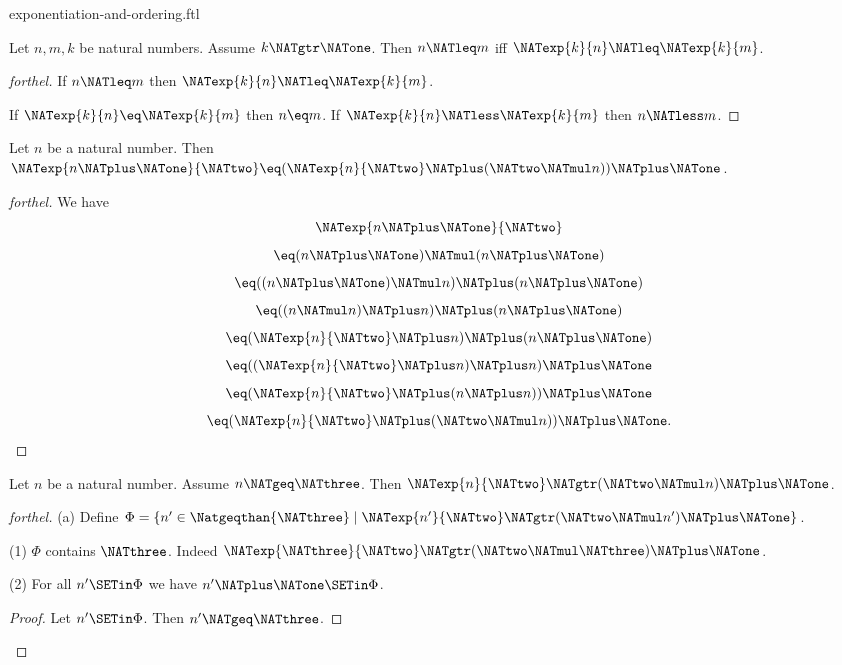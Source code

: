 \documentclass{naproche-library}
\begin{document}
\begin{smodule}[title=Exponentiation and Ordering]{exponentiation-and-ordering.ftl}
\begin{corollary}[forthel,id=ARITHMETIC_09_2876620253691904]
  Let $n, m, k$ be natural numbers.
  Assume $k \NATgtr \NATone$.
  Then $n \NATleq m$ iff $\NATexp{k}{n} \NATleq \NATexp{k}{m}$.
\end{corollary}
\begin{proof}[forthel]
  If $n \NATleq m$ then $\NATexp{k}{n} \NATleq \NATexp{k}{m}$.

  If $\NATexp{k}{n} \eq \NATexp{k}{m}$ then $n \eq m$.
  If $\NATexp{k}{n} \NATless \NATexp{k}{m}$ then $n \NATless m$.
\end{proof}

\begin{proposition}[forthel,id=ARITHMETIC_09_6984104377581568]
  Let $n$ be a natural number.
  Then $\NATexp{n \NATplus \NATone}{\NATtwo} \eq (\NATexp{n}{\NATtwo} \NATplus (\NATtwo \NATmul n)) \NATplus \NATone$.
\end{proposition}
\begin{proof}[forthel]
  We have
  \[  \NATexp{n \NATplus \NATone}{\NATtwo}                       \]
  \[    \eq (n \NATplus \NATone) \NATmul (n \NATplus \NATone)         \]
  \[    \eq ((n \NATplus \NATone) \NATmul n) \NATplus (n \NATplus \NATone)   \]
  \[    \eq ((n \NATmul n) \NATplus n) \NATplus (n \NATplus \NATone)   \]
  \[    \eq (\NATexp{n}{\NATtwo} \NATplus n) \NATplus (n \NATplus \NATone)         \]
  \[    \eq ((\NATexp{n}{\NATtwo} \NATplus n) \NATplus n) \NATplus \NATone         \]
  \[    \eq (\NATexp{n}{\NATtwo} \NATplus (n \NATplus n)) \NATplus \NATone         \]
  \[    \eq (\NATexp{n}{\NATtwo} \NATplus (\NATtwo \NATmul n)) \NATplus \NATone.    \]
\end{proof}

\begin{proposition}[forthel,id=ARITHMETIC_09_134060414337024]
  Let $n$ be a natural number.
  Assume $n \NATgeq \NATthree$.
  Then $\NATexp{n}{\NATtwo} \NATgtr (\NATtwo \NATmul n) \NATplus \NATone$.
\end{proposition}
\begin{proof}[forthel]
  (a) Define $\Phi = \{ n' \in \Natgeqthan{\NATthree} \mid \NATexp{n'}{\NATtwo} \NATgtr (\NATtwo \NATmul n') \NATplus \NATone \}$.

  (1) $\Phi$ contains $\NATthree$.
  Indeed $\NATexp{\NATthree}{\NATtwo} \NATgtr (\NATtwo \NATmul \NATthree) \NATplus \NATone$.

  (2) For all $n' \SETin \Phi$ we have $n' \NATplus \NATone \SETin \Phi$.
  \begin{proof}
    Let $n' \SETin \Phi$.
    Then $n' \NATgeq \NATthree$.


\end{proof}
\end{proof}
\end{smodule}
\end{document}
